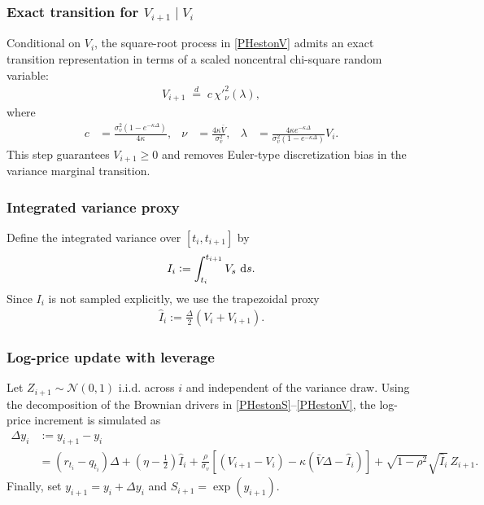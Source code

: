 \documentclass[11pt,a4paper,notitlepage]{article}
\numberwithin{equation}{section}
\begin{document}
\subsubsection{Exact transition for $V_{i+1}\mid V_i$}
Conditional on $V_i$, the square-root process in \eqref{PHestonV} admits an exact transition
representation in terms of a scaled noncentral chi-square random variable:
\begin{align}
V_{i+1} \;\overset{d}{=}\; c\,\chi'^2_{\nu}(\lambda),
\label{eq:CIR_exact}
\end{align}
where
\begin{align}
c &= \frac{\sigma_v^2\left(1-e^{-\kappa \Delta}\right)}{4\kappa}, &
\nu &= \frac{4\kappa \bar{V}}{\sigma_v^2}, &
\lambda &= \frac{4\kappa e^{-\kappa \Delta}}{\sigma_v^2\left(1-e^{-\kappa \Delta}\right)}V_i.
\label{eq:CIR_exact_params}
\end{align}
This step guarantees $V_{i+1}\geq 0$ and removes Euler-type discretization bias in the variance
marginal transition.

\subsubsection{Integrated variance proxy}
Define the integrated variance over $[t_i,t_{i+1}]$ by
\begin{align}
I_i := \int_{t_i}^{t_{i+1}} V_s\,\dif s.
\end{align}
Since $I_i$ is not sampled explicitly, we use the trapezoidal proxy
\begin{align}
\widehat{I}_i := \frac{\Delta}{2}\left(V_i+V_{i+1}\right).
\label{eq:I_trap}
\end{align}

\subsubsection{Log-price update with leverage}
Let $Z_{i+1}\sim\mathcal{N}(0,1)$ i.i.d. across $i$ and independent of the variance draw.
Using the decomposition of the Brownian drivers in \eqref{PHestonS}--\eqref{PHestonV},
the log-price increment is simulated as
\begin{align}
\Delta y_i
&:= y_{i+1}-y_i \nonumber\\
&= (r_{t_i}-q_{t_i})\Delta
+ \left(\eta-\frac{1}{2}\right)\widehat{I}_i
+ \frac{\rho}{\sigma_v}\left[\left(V_{i+1}-V_i\right)-\kappa\left(\bar{V}\Delta-\widehat{I}_i\right)\right]
+ \sqrt{1-\rho^2}\sqrt{\widehat{I}_i}\,Z_{i+1}.
\label{eq:logS_update}
\end{align}
Finally, set $y_{i+1}=y_i+\Delta y_i$ and $S_{i+1}=\exp(y_{i+1})$.
\end{document}
